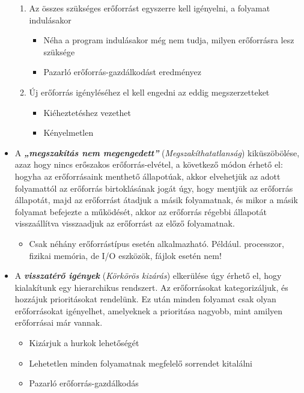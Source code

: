 \documentclass[tikz,12pt,margin=0px]{article}
\begin{document}
\begin{itemize}[topsep=8pt,itemsep=4pt,partopsep=4pt, parsep=4pt]
            \begin{enumerate}
                \item Az összes szükséges erőforrást egyszerre kell igényelni, a folyamat indulásakor
                \begin{itemize}
                    \item Néha a program indulásakor még nem tudja, milyen erőforrásra lesz szüksége
                    \item Pazarló erőforrás-gazdálkodást eredményez
                \end{itemize}
                \item Új erőforrás igényléséhez el kell engedni az eddig megszerzetteket
                \begin{itemize}
                    \item Kiéheztetéshez vezethet
                    \item Kényelmetlen
                \end{itemize}
            \end{enumerate}
        \item A \emph{\textbf{„megszakítás nem megengedett”}} (\emph{Megszakíthatatlanság}) kiküszöbölése, azaz hogy nincs erőszakos erőforrás-elvétel, a következő módon érhető el: hogyha az erőforrásaink menthető állapotúak, akkor elvehetjük az adott folyamattól az erőforrás birtoklásának jogát úgy, hogy mentjük az erőforrás állapotát, majd az erőforrást átadjuk a másik folyamatnak, és mikor a másik folyamat befejezte a működését, akkor az erőforrás régebbi állapotát visszaállítva visszaadjuk az erőforrást az előző folyamatnak.
            \begin{itemize}
                \item Csak néhány erőforrástípus esetén alkalmazható. Például. processzor, fizikai memória, de I/O eszközök, fájlok esetén nem!
            \end{itemize}
        \item A \emph{\textbf{visszatérő igények}} (\emph{Körkörös kizárás}) elkerülése úgy érhető el, hogy kialakítunk egy hierarchikus rendszert. Az erőforrásokat kategorizáljuk, és hozzájuk prioritásokat rendelünk. Ez után minden folyamat csak olyan erőforrásokat igényelhet, amelyeknek a prioritása nagyobb, mint amilyen erőforrásai már vannak.

        \begin{itemize}
            \item Kizárjuk a hurkok lehetőségét
            \item Lehetetlen minden folyamatnak megfelelő sorrendet kitalálni
            \item Pazarló erőforrás-gazdálkodás
        \end{itemize}
    \end{itemize}
\end{document}
